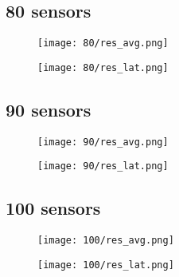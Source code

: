 \subsection{80 sensors}
\begin{figure}[H]
\texttt{[image: 80/res\_avg.png]}
\end{figure}
\begin{figure}[H]
\texttt{[image: 80/res\_lat.png]}
\end{figure}

\subsection{90 sensors}
\begin{figure}[H]
\texttt{[image: 90/res\_avg.png]}
\end{figure}
\begin{figure}[H]
\texttt{[image: 90/res\_lat.png]}
\end{figure}

\subsection{100 sensors}
\begin{figure}[H]
\texttt{[image: 100/res\_avg.png]}
\end{figure}
\begin{figure}[H]
\texttt{[image: 100/res\_lat.png]}
\end{figure}
